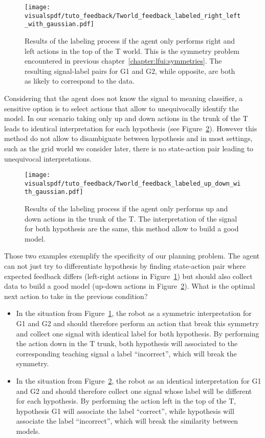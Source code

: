 \begin{figure}[!htbp]
  \centering
  \texttt{[image: \\visualspdf/tuto\_feedback/Tworld\_feedback\_labeled\_right\_left\_with\_gaussian.pdf]}
  \caption{Results of the labeling process if the agent only performs right and left actions in the top of the T world. This is the symmetry problem encountered in previous chapter~\ref{chapter:lfui:symmetries}. The resulting signal-label pairs for G1 and G2, while opposite, are both as likely to correspond to the data.}
  \label{fig:planningrightleft}
\end{figure}

Considering that the agent does not know the signal to meaning classifier, a sensitive option is to select actions that allow to unequivocally identify the model. In our scenario taking only up and down actions in the trunk of the T leads to identical interpretation for each hypothesis (see Figure~\ref{fig:planningupdown}). However this method do not allow to disambiguate between hypothesis and in most settings, such as the grid world we consider later, there is no state-action pair leading to unequivocal interpretations.

\begin{figure}[!htbp]
  \centering
  \texttt{[image: \\visualspdf/tuto\_feedback/Tworld\_feedback\_labeled\_up\_down\_with\_gaussian.pdf]}
  \caption{Results of the labeling process if the agent only performs up and down actions in the trunk of the T. The interpretation of the signal for both hypothesis are the same, this method allow to build a good model.}
  \label{fig:planningupdown}
\end{figure}

Those two examples exemplify the specificity of our planning problem. The agent can not just try to differentiate hypothesis by finding state-action pair where expected feedback differs (left-right actions in Figure~\ref{fig:planningrightleft}) but should also collect data to build a good model (up-down actions in Figure~\ref{fig:planningupdown}). What is the optimal next action to take in the previous condition?

\begin{itemize}
\item In the situation from Figure~\ref{fig:planningrightleft}, the robot as a symmetric interpretation for G1 and G2 and should therefore perform an action that break this symmetry and collect one signal with identical label for both hypothesis. By performing the action down in the T trunk, both hypothesis will associated to the corresponding teaching signal a label ``incorrect'', which will break the symmetry.
\item In the situation from Figure~\ref{fig:planningupdown}, the robot as an identical interpretation for G1 and G2 and should therefore collect one signal whose label will be different for each hypothesis. By performing the action left in the top of the T, hypothesis G1 will associate the label ``correct'', while hypothesis will associate the label ``incorrect'', which will break the similarity between models.
\end{itemize}

